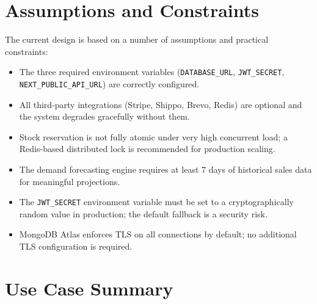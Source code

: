 \documentclass[12pt,a4paper]{report}
\begin{document}
\section{Assumptions and Constraints}

The current design is based on a number of assumptions and practical constraints:
\begin{itemize}
    \item The three required environment variables (\texttt{DATABASE\_URL}, \texttt{JWT\_SECRET}, \texttt{NEXT\_PUBLIC\_API\_URL}) are correctly configured.
    \item All third-party integrations (Stripe, Shippo, Brevo, Redis) are optional and the system degrades gracefully without them.
    \item Stock reservation is not fully atomic under very high concurrent load; a Redis-based distributed lock is recommended for production scaling.
    \item The demand forecasting engine requires at least 7 days of historical sales data for meaningful projections.
    \item The \texttt{JWT\_SECRET} environment variable must be set to a cryptographically random value in production; the default fallback is a security risk.
    \item MongoDB Atlas enforces TLS on all connections by default; no additional TLS configuration is required.
\end{itemize}

\section{Use Case Summary}
\end{document}

